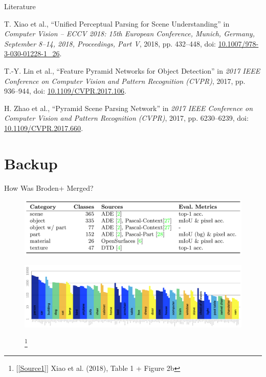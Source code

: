 \documentclass{beamer}
\newcommand\blfootnote[1]{
  \begingroup
  \renewcommand\thefootnote{}\footnote{#1}
  \addtocounter{footnote}{-1}
  \endgroup
}
\begin{document}
\appendix
{}

\begin{frame}{Literature}
\small
\begin{enumerate}[ {[}1{]} ]
    \item \label{Source1} T. Xiao et al., ``Unified Perceptual Parsing for Scene Understanding'' in \emph{Computer Vision – ECCV 2018: 15th European Conference, Munich, Germany, September 8–14, 2018, Proceedings, Part V}, 2018, pp. 432–448, doi: \href{https://doi.org/10.1007/978-3-030-01228-1_26}{10.1007/978-3-030-01228-1\_26}.
    
    \item \label{Source2} T.-Y. Lin et al., ``Feature Pyramid Networks for Object Detection'' in \emph{2017 IEEE Conference on Computer Vision and Pattern Recognition (CVPR)}, 2017, pp. 936–944, doi: \href{https://doi.org/10.1109/CVPR.2017.106}{10.1109/CVPR.2017.106}.
    
    \item \label{Source3} H. Zhao et al., ``Pyramid Scene Parsing Network'' in \emph{2017 IEEE Conference on Computer Vision and Pattern Recognition (CVPR)}, 2017, pp. 6230–6239, doi: \href{https://doi.org/10.1109/CVPR.2017.660}{10.1109/CVPR.2017.660}.
\end{enumerate}
\end{frame}

\section{Backup}

\begin{frame}{How Was Broden+ Merged?}
\centering
  \begin{figure}
    \includegraphics[width=\linewidth]{Images/Table1.png}
  \end{figure}
  \begin{figure}
    \includegraphics[width=\linewidth]{Images/Figure 2b.png}
    \blfootnote{[\ref{Source1}] Xiao et al. (2018), Table 1 + Figure 2b}
  \end{figure}
\end{frame}
\end{document}
